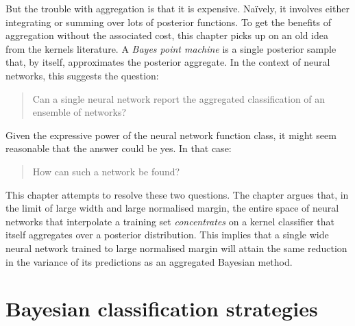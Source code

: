\begin{refsection}
But the trouble with aggregation is that it is expensive. Naïvely, it involves either integrating or summing over lots of posterior functions. To get the benefits of aggregation without the associated cost, this chapter picks up on an old idea from the kernels literature.  A \textit{Bayes point machine} \citep{bpms} is a single posterior sample that, by itself, approximates the posterior aggregate. In the context of neural networks, this suggests the question:
\begin{quote}
    Can a single neural network report the aggregated classification of an ensemble of networks?
\end{quote}
Given the expressive power of the neural network function class, it might seem reasonable that the answer could be yes. In that case:
\begin{quote}
    How can such a network be found?
\end{quote}
This chapter attempts to resolve these two questions. The chapter argues that, in the limit of large width and large normalised margin, the entire space of neural networks that interpolate a training set \textit{concentrates} on a kernel classifier that itself aggregates over a posterior distribution. This implies that a single wide neural network trained to large normalised margin will attain the same reduction in the variance of its predictions as an aggregated Bayesian method.

\section{Bayesian classification strategies}


\end{refsection}
